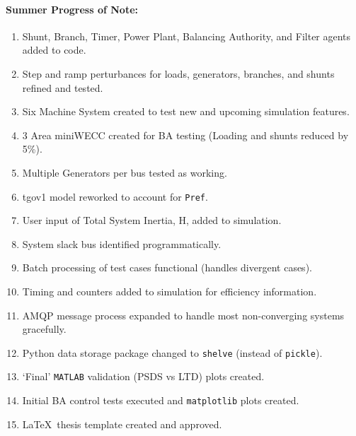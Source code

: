\documentclass[12pt]{article}
\begin{document}
\paragraph{Summer Progress of Note:}
\begin{enumerate}
	\item Shunt, Branch, Timer, Power Plant, Balancing Authority, and Filter agents added to code.
	\item Step and ramp perturbances for loads, generators, branches, and shunts refined and tested.
	
	\item Six Machine System created to test new and upcoming simulation features.	
	\item 3 Area miniWECC created for BA testing (Loading and shunts reduced by 5\%).
	\item Multiple Generators per bus tested as working.
	
	\item tgov1 model reworked to account for \verb|Pref|.
	\item User input of Total System Inertia, H, added to simulation.
	\item System slack bus identified programmatically. %
	
	\item Batch processing of test cases functional (handles divergent cases).
	\item Timing and counters added to simulation for efficiency information.
	\item AMQP message process expanded to handle most non-converging systems gracefully.
	\item Python data storage package changed to \verb|shelve| (instead of \verb|pickle|).

	\item `Final' \verb|MATLAB| validation (PSDS vs LTD) plots created.
	\item Initial BA control tests executed and \verb|matplotlib| plots created.	
	
	\item \LaTeX\ thesis template created and approved.%
	
\end{enumerate}
\end{document}
